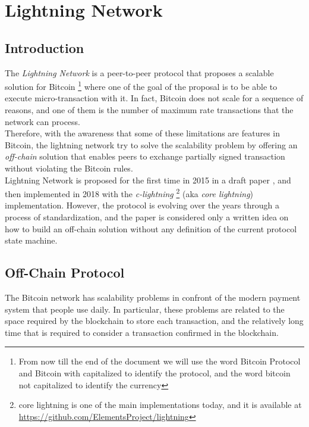 \chapter{Lightning Network}
\label{sec:lightning_network}

\newcommand{\noteOnBitcoinNaming}[0]{
    \footnote{
        From now till the end of the document we will use the word Bitcoin Protocol and
        Bitcoin with capitalized to identify the protocol, and the word bitcoin not capitalized to identify the currency
    }
}

\newcommand{\noteOnCLNImpl}[0]{
    \footnote{
    core lightning is one of the main implementations today, and it is available at
    \href{https://github.com/ElementsProject/lightning}{https://github.com/ElementsProject/lightning}
    }
}



\section{Introduction}

The \emph{Lightning Network} is a peer-to-peer protocol that proposes a scalable solution for Bitcoin\noteOnBitcoinNaming where one
of the goal of the proposal is to be able to execute micro-transaction with it.
In fact, Bitcoin does not scale for a sequence of reasons, and one of them is the number of
maximum rate transactions that the network can process.\\
Therefore, with the awareness that some of these limitations are features in Bitcoin, the lightning network try to solve
the scalability problem by offering an \emph{off-chain} solution that enables peers to exchange partially
signed transaction without violating the Bitcoin rules.\\
Lightning Network is proposed for the first time in 2015 in a draft paper \cite{lightning-network-paper},
and then implemented in 2018 with the \emph{c-lightning}\noteOnCLNImpl (aka \emph{core lightning}) implementation.
However, the protocol is evolving over the years through a process of standardization\cite{lightning-bolts}, and the paper is considered
only a written idea on how to build an off-chain solution without any definition of the current protocol state machine.

\section{Off-Chain Protocol}

The Bitcoin network has scalability problems in confront of the modern payment system that people use daily.
In particular, these problems are related to the space required by the blockchain to store each transaction,
and the relatively long time that is required to consider a transaction confirmed in the blockchain.


